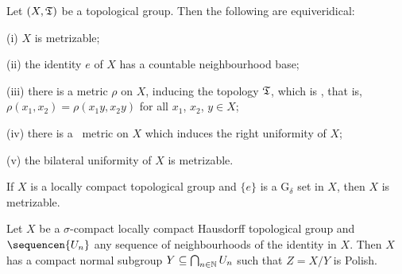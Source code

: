  Let $(X,\frak T)$ be a
topological group.  Then the following are equiveridical:

(i) $X$ is metrizable;

(ii) the identity $e$ of $X$ has a countable neighbourhood base;

(iii) there is a metric $\rho$ on $X$, inducing the topology
$\frak T$, which is {\bf \rti}, that is, $\rho(x_1,x_2)=\rho(x_1y,x_2y)$
for all $x_1$, $x_2$, $y\in X$;

(iv) there is a \rti\ metric on $X$ which induces the right uniformity
of $X$;

(v) the bilateral uniformity of $X$ is metrizable.




 If $X$ is a locally compact topological group
and $\{e\}$ is a G$_{\delta}$ set in $X$, then $X$ is metrizable.

Let $X$ be a $\sigma$-compact locally compact
Hausdorff topological group and $\sequencen{U_n}$ any sequence of
neighbourhoods of the identity in $X$.   Then $X$ has a compact normal
subgroup $Y\subseteq\bigcap_{n\in\Bbb N}U_n$ such that $Z=X/Y$ is
Polish.

